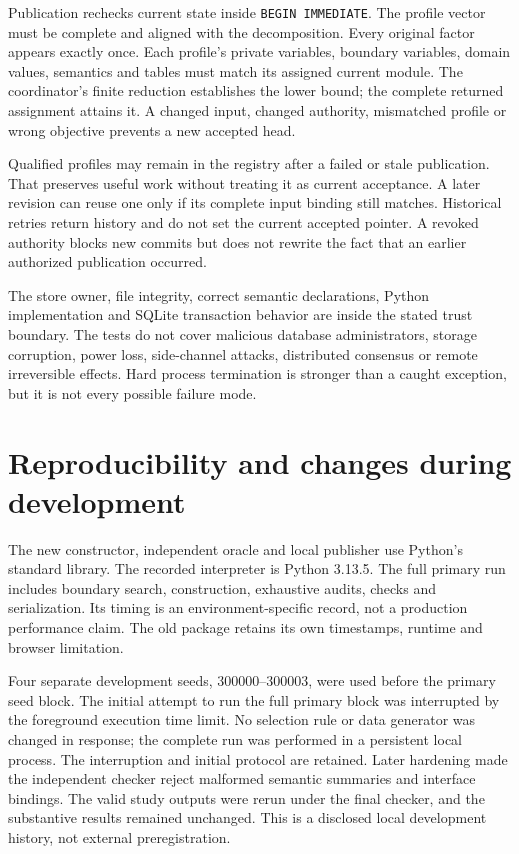 \documentclass[11pt,letterpaper]{article}
\theoremstyle{definition}\newtheorem{definition}[theorem]{Definition}
\theoremstyle{remark}\newtheorem{remark}[theorem]{Remark}
\begin{document}
Publication rechecks current state inside \texttt{BEGIN IMMEDIATE}. The profile vector must be complete and aligned with the decomposition. Every original factor appears exactly once. Each profile's private variables, boundary variables, domain values, semantics and tables must match its assigned current module. The coordinator's finite reduction establishes the lower bound; the complete returned assignment attains it. A changed input, changed authority, mismatched profile or wrong objective prevents a new accepted head.

Qualified profiles may remain in the registry after a failed or stale publication. That preserves useful work without treating it as current acceptance. A later revision can reuse one only if its complete input binding still matches. Historical retries return history and do not set the current accepted pointer. A revoked authority blocks new commits but does not rewrite the fact that an earlier authorized publication occurred.

The store owner, file integrity, correct semantic declarations, Python implementation and SQLite transaction behavior are inside the stated trust boundary. The tests do not cover malicious database administrators, storage corruption, power loss, side-channel attacks, distributed consensus or remote irreversible effects. Hard process termination is stronger than a caught exception, but it is not every possible failure mode.

\section{Reproducibility and changes during development}
\label{app:reproduce}
The new constructor, independent oracle and local publisher use Python's standard library. The recorded interpreter is Python 3.13.5. The full primary run includes boundary search, construction, exhaustive audits, checks and serialization. Its timing is an environment-specific record, not a production performance claim. The old package retains its own timestamps, runtime and browser limitation.

Four separate development seeds, 300000--300003, were used before the primary seed block. The initial attempt to run the full primary block was interrupted by the foreground execution time limit. No selection rule or data generator was changed in response; the complete run was performed in a persistent local process. The interruption and initial protocol are retained. Later hardening made the independent checker reject malformed semantic summaries and interface bindings. The valid study outputs were rerun under the final checker, and the substantive results remained unchanged. This is a disclosed local development history, not external preregistration.
\end{document}
